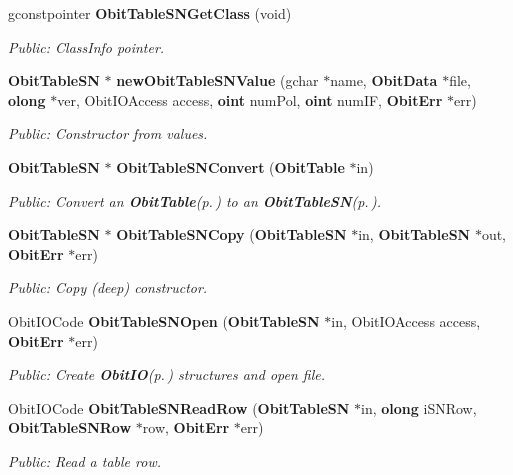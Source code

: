 \begin{CompactItemize}
gconstpointer {\bf Obit\-Table\-SNGet\-Class} (void)
\begin{CompactList}\small\item\em Public: Class\-Info pointer. \item\end{CompactList}\item 
{\bf Obit\-Table\-SN} $\ast$ {\bf new\-Obit\-Table\-SNValue} (gchar $\ast$name, {\bf Obit\-Data} $\ast$file, {\bf olong} $\ast$ver, Obit\-IOAccess access, {\bf oint} num\-Pol, {\bf oint} num\-IF, {\bf Obit\-Err} $\ast$err)
\begin{CompactList}\small\item\em Public: Constructor from values. \item\end{CompactList}\item 
{\bf Obit\-Table\-SN} $\ast$ {\bf Obit\-Table\-SNConvert} ({\bf Obit\-Table} $\ast$in)
\begin{CompactList}\small\item\em Public: Convert an {\bf Obit\-Table}{\rm (p.\,\pageref{structObitTable})} to an {\bf Obit\-Table\-SN}{\rm (p.\,\pageref{structObitTableSN})}. \item\end{CompactList}\item 
{\bf Obit\-Table\-SN} $\ast$ {\bf Obit\-Table\-SNCopy} ({\bf Obit\-Table\-SN} $\ast$in, {\bf Obit\-Table\-SN} $\ast$out, {\bf Obit\-Err} $\ast$err)
\begin{CompactList}\small\item\em Public: Copy (deep) constructor. \item\end{CompactList}\item 
Obit\-IOCode {\bf Obit\-Table\-SNOpen} ({\bf Obit\-Table\-SN} $\ast$in, Obit\-IOAccess access, {\bf Obit\-Err} $\ast$err)
\begin{CompactList}\small\item\em Public: Create {\bf Obit\-IO}{\rm (p.\,\pageref{structObitIO})} structures and open file. \item\end{CompactList}\item 
Obit\-IOCode {\bf Obit\-Table\-SNRead\-Row} ({\bf Obit\-Table\-SN} $\ast$in, {\bf olong} i\-SNRow, {\bf Obit\-Table\-SNRow} $\ast$row, {\bf Obit\-Err} $\ast$err)
\begin{CompactList}\small\item\em Public: Read a table row. \item\end{CompactList}\item 

\end{CompactItemize}
